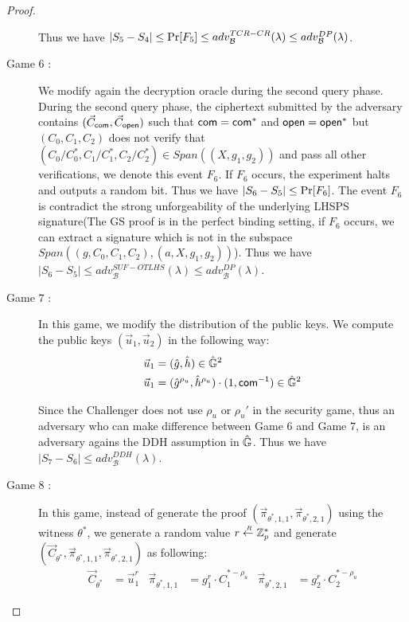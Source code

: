 \begin{proof}
\begin{description}
    Thus we have $|S_5 - S_4| \leq \operatorname{Pr}[F_5] \leq adv_{\mathcal{B}}^{TCR-CR}(\lambda) \leq adv_{\mathcal{B}}^{DP}(\lambda)$. 

  \item[\textsf{Game} $6$ :] We modify again the decryption oracle during the second query phase. During the second query phase, the ciphertext submitted by the adversary contains $(\vec{C}_{\mathsf{com}}, \vec{C}_{\mathsf{open}})$ such that $\mathsf{com} = \mathsf{com}^*$ and $\mathsf{open} = \mathsf{open}^*$ but $(C_0, C_1, C_2)$ does not verify that $(C_0/ C_0^*, C_1/C_1^*, C_2/C_2^*) \in Span((X, g_1, g_2))$ and pass all other verifications, we denote this event $F_6$. If $F_6$ occurs, the experiment halts and outputs a random bit. Thus we have $|S_6 - S_5| \leq \operatorname{Pr}[F_6]$. The event $F_6$ is contradict the strong unforgeability of the underlying LHSPS signature(The GS proof is in the perfect binding setting, if $F_6$ occurs, we can extract a signature which is not in the subspace $Span((g, C_0, C_1, C_2), (a, X, g_1, g_2))$). Thus we have $|S_6 - S_5| \leq adv_{\mathcal{B}}^{SUF-OTLHS}(\lambda) \leq adv_{\mathcal{B}}^{DP}(\lambda)$.
    
    
  \item[\textsf{Game} $7$ :] In this game, we modify the distribution of the public keys. We compute the public keys $(\vec{u}_1, \vec{u}_2)$ in the following way:
    \begin{align*}
      \vec{u}_1 &= (\hat{g}, \hat{h}) \in \hat{\mathbb{G}}^2\\
      \vec{u}_1 &= (\hat{g}^{\rho_u}, \hat{h}^{\rho_u}) \cdot (1, \mathsf{com}^{-1}) \in \hat{\mathbb{G}}^2
    \end{align*}

    Since the Challenger does not use $\rho_u$ or $\rho_u'$ in the security game, thus an adversary who can make difference between \textsf{Game} $6$ and \textsf{Game} $7$, is an adversary agains the DDH assumption in $\hat{\mathbb{G}}$. Thus we have $|S_7 - S_6| \leq adv_{\mathcal{B}}^{DDH}(\lambda)$.

  \item[\textsf{Game} $8$ :] In this game, instead of generate the proof $(\vec{\pi}_{\theta^*, 1, 1}, \vec{\pi}_{\theta^*, 2, 1})$ using the witness $\theta^*$, we generate a random value $r \stackrel{{\scriptscriptstyle \mkern4mu R}}{\gets} \mathbb{Z}_p^*$ and generate $(\vec{C}_{\theta^*}, \vec{\pi}_{\theta^*,1,1}, \vec{\pi}_{\theta^*,2,1})$ as following:
    \begin{align*}
      \vec{C}_{\theta^*} &= \vec{u}_1^r & \vec{\pi}_{\theta^*,1,1} &= g_1^r \cdot C_1^{*-\rho_u} & \vec{\pi}_{\theta^*,2,1} &= g_2^r \cdot C_2^{*-\rho_u}
    \end{align*}


\end{description}
\end{proof}
